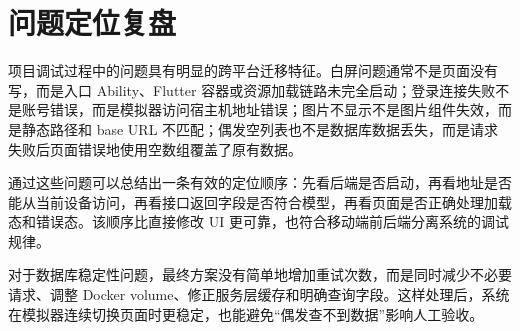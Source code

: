\section{问题定位复盘}

项目调试过程中的问题具有明显的跨平台迁移特征。白屏问题通常不是页面没有写，而是入口 Ability、Flutter 容器或资源加载链路未完全启动；登录连接失败不是账号错误，而是模拟器访问宿主机地址错误；图片不显示不是图片组件失效，而是静态路径和 base URL 不匹配；偶发空列表也不是数据库数据丢失，而是请求失败后页面错误地使用空数组覆盖了原有数据。

通过这些问题可以总结出一条有效的定位顺序：先看后端是否启动，再看地址是否能从当前设备访问，再看接口返回字段是否符合模型，再看页面是否正确处理加载态和错误态。该顺序比直接修改 UI 更可靠，也符合移动端前后端分离系统的调试规律。

对于数据库稳定性问题，最终方案没有简单地增加重试次数，而是同时减少不必要请求、调整 Docker volume、修正服务层缓存和明确查询字段。这样处理后，系统在模拟器连续切换页面时更稳定，也能避免“偶发查不到数据”影响人工验收。
